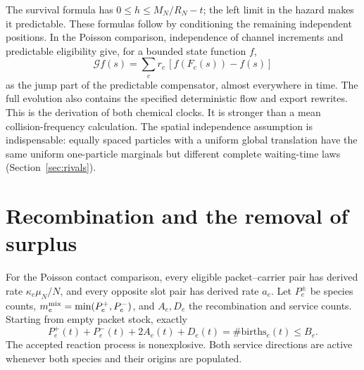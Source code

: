 \documentclass[11pt]{article}
\theoremstyle{definition}\newtheorem{definition}[theorem]{Definition}
\theoremstyle{remark}\newtheorem{remark}[theorem]{Remark}
\begin{document}
The survival formula has $0\le h\le M_N/R_N-t$; the left limit in the hazard makes it predictable. These formulas follow by conditioning the remaining independent positions. In the Poisson comparison, independence of channel increments and predictable eligibility give, for a bounded state function $f$,
\begin{equation}
 \mathcal Gf(s)=\sum_c r_c\,[f(F_c(s))-f(s)]
 \label{eq:generator}
\end{equation}
as the jump part of the predictable compensator, almost everywhere in time. The full evolution also contains the specified deterministic flow and export rewrites. This is the derivation of both chemical clocks. It is stronger than a mean collision-frequency calculation. The spatial independence assumption is indispensable: equally spaced particles with a uniform global translation have the same uniform one-particle marginals but different complete waiting-time laws (Section~\ref{sec:rivals}).

\section{Recombination and the removal of surplus}
For the Poisson contact comparison, every eligible packet--carrier pair has derived rate $\kappa_e\mu_N/N$, and every opposite slot pair has derived rate $a_e$. Let $P_e^\pm$ be species counts, $m_e^{\rm mix}=\min(P_e^+,P_e^-)$, and $A_e,D_e$ the recombination and service counts. Starting from empty packet stock, exactly
\begin{equation}
 P_e^+(t)+P_e^-(t)+2A_e(t)+D_e(t)=\#\mathrm{births}_e(t)\le B_e.
 \label{eq:stock}
\end{equation}
The accepted reaction process is nonexplosive. Both service directions are active whenever both species and their origins are populated.
\end{document}
